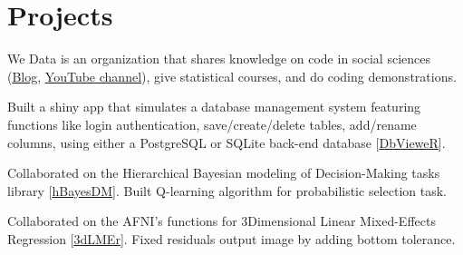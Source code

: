 \documentclass[]{plushcv}
\begin{document}
\begin{minipage}[t]{0.70\textwidth} 
\sectionsep
\sectionsep
\sectionsep
\sectionsep
\sectionsep
\sectionsep
\sectionsep
\sectionsep





\section{Projects}
\sectionsep

\sectionsep
{}
\begin{tightemize}
\item We Data is an organization that shares knowledge on code in social sciences (\href{https://wedata.ch/}{\underline{Blog}}, \href{https://www.youtube.com/channel/UCGktdbvbc_H-JEkYYTvwRVw}{\underline{YouTube channel}}), give statistical courses, and do coding demonstrations. 
\end{tightemize}
\sectionsep

\begin{tightemize}
\item Built a shiny app that simulates a database management system featuring functions like login authentication, save/create/delete tables, add/rename columns, using either a PostgreSQL or SQLite back-end database [\href{https://github.com/munoztd0/DBMS}{\underline{DbVieweR}}].
\end{tightemize}
\sectionsep
{}
\begin{tightemize}
\item Collaborated on the Hierarchical Bayesian modeling of Decision-Making tasks library [\href{https://github.com/CCS-Lab/hBayesDM}{\underline{hBayesDM}}]. Built Q-learning algorithm for probabilistic selection task.
\end{tightemize}
\sectionsep



\begin{tightemize}
\item Collaborated on the AFNI's functions for 3Dimensional Linear Mixed-Effects Regression [\href{https://github.com/afni/afni/blob/ebd2aef51c27cf7684f38f580e1db832b1ccf621/src/R_scripts/3dLMEr.R}{\underline{3dLMEr}}]. Fixed residuals output image by adding bottom tolerance.
\end{tightemize}
\sectionsep


\end{minipage}
\end{document}
